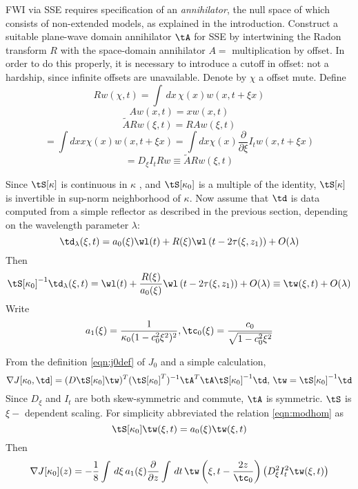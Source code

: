 FWI via SSE requires specification of an {\em annihilator}, the null
space of which consists of non-extended models, as explained in the
introduction.  Construct a suitable plane-wave domain annihilator
$\tA$ for
SSE by intertwining the Radon transform $R$ with the space-domain
annihilator $A = $ multiplication by offset. In order to do this
properly, it is necessary to introduce a cutoff in offset: not a
hardship, since infinite offsets are unavailable. Denote by $\chi$ a
offset mute. Define
\[
Rw(\chi,t) = \int \,dx\,\chi(x) w(x,t+\xi x)
\]
\[
Aw(x,t)=x w(x,t)
\]
\[
\tilde{A} Rw (\xi,t) = R Aw (\xi,t)
\]
\[
=\int dx x \chi(x) w(x,t+\xi x) = \int dx \chi(x)\frac{\partial}{\partial \xi}
I_tw(x,t+\xi x)
\]
\[
= D_{\xi} I_t R  w \equiv \tilde{A} Rw (\xi,t) 
\]

Since $\tS[\kappa]$ is continuous in $\kappa$
\cite[]{BlazekStolkSymes:13}, and $\tS[\kappa_0]$ is a multiple of the
identity, $\tS[\kappa]$ is invertible in sup-norm neighborhood of
$\kappa$.
Now assume that $\td$ is data computed from a simple reflector as
described in the previous section, depending on the wavelength
parameter $\lambda$:
\[
\td_{\lambda}(\xi,t) = a_0(\xi)\wl(t) +
R(\xi)\wl\left(t-2\tau(\xi,z_1)\right) + O(\lambda)
\]
Then
\begin{equation}
\label{eqn:wtildedef}
\tS[\kappa_0]^{-1}\td_{\lambda}(\xi,t) = \wl(t) +
\frac{R(\xi)}{a_0(\xi)}\wl\left(t-2\tau(\xi,z_1)\right) + O(\lambda)
\equiv \tw(\xi,t) + O(\lambda)
\end{equation}
Write 
\[
a_1(\xi)=\frac{1}{\kappa_0 (1-c_0^2\xi^2)^2}, \tc_0(\xi) =
\frac{c_0}{\sqrt{1-c_0^2\xi^2}}
\]



From the definition \ref{eqn:j0def} of $J_0$ and a simple calculation,
\[
\nabla J[\kappa_0,\td] = (D\tS[\kappa_0]\tw)^T(\tS[\kappa_0]^T)^{-1}\tA^T\tA
\tS[\kappa_0]^{-1}\td,  \,\tw=\tS[\kappa_0]^{-1}\td
\]
Since $D_{\xi}$ and $I_t$ are both skew-symmetric and commute, $\tA$
is symmetric. $\tS$ is $\xi-$ dependent scaling. For simplicity
abbreviated the relation \ref{eqn:modhom} as
\[
\tS[\kappa_0]\tw(\xi,t) = a_0(\xi)\tw(\xi,t)
\]
Then
\[
\nabla J[\kappa_0](z) =
- 
\frac{1}{8} \int \,d\xi\,a_1(\xi)\frac{\partial}{\partial z} \int \,dt\, 
  \tw\left(\xi,t-\frac{2z}{\tc_0}\right)\left(D_{\xi}^2I_t^2 \tw(\xi,t)\right)
\]


